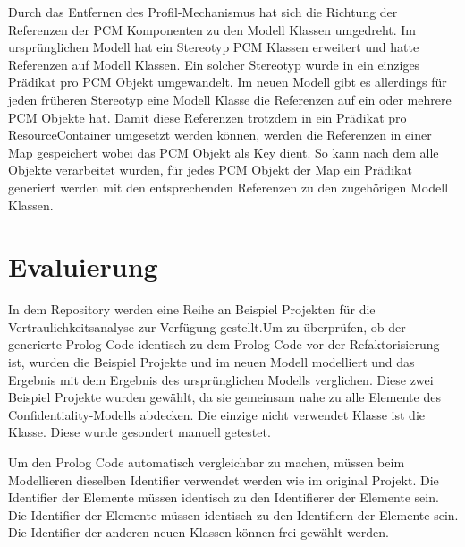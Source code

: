 \documentclass[twoside, ngerman]{sdqseminar}
\begin{document}
Durch das Entfernen des Profil-Mechanismus hat sich die Richtung der Referenzen der PCM Komponenten zu den Modell Klassen umgedreht. Im ursprünglichen Modell hat ein Stereotyp PCM Klassen erweitert und hatte Referenzen auf Modell Klassen. Ein solcher Stereotyp wurde in ein einziges Prädikat pro PCM Objekt umgewandelt. Im neuen Modell gibt es allerdings für jeden früheren Stereotyp eine Modell Klasse die Referenzen auf ein oder mehrere PCM Objekte hat. Damit diese Referenzen trotzdem in ein Prädikat pro ResourceContainer umgesetzt werden können, werden die Referenzen in einer Map gespeichert wobei das PCM Objekt als Key dient. So kann nach dem alle Objekte verarbeitet wurden, für jedes PCM Objekt der Map ein Prädikat generiert werden mit den entsprechenden Referenzen zu den zugehörigen Modell Klassen.

\section{Evaluierung}
In dem Repository  \cite{Examples4SCBS} werden eine Reihe an Beispiel Projekten für die Vertraulichkeitsanalyse zur Verfügung gestellt.Um zu überprüfen, ob der generierte Prolog Code identisch zu dem Prolog Code vor der Refaktorisierung ist, wurden die Beispiel Projekte  und  im neuen Modell modelliert und das Ergebnis mit dem Ergebnis des ursprünglichen Modells verglichen. Diese zwei Beispiel Projekte wurden gewählt, da sie gemeinsam nahe zu alle Elemente des Confidentiality-Modells abdecken. Die einzige nicht verwendet Klasse ist die  Klasse. Diese wurde gesondert manuell getestet.

Um den Prolog Code automatisch vergleichbar zu machen, müssen beim Modellieren dieselben Identifier verwendet werden wie im original Projekt. Die Identifier der  Elemente müssen identisch zu den Identifierer der  Elemente sein. Die Identifier der  Elemente müssen identisch zu den Identifiern der  Elemente sein. Die Identifier der anderen neuen Klassen können frei gewählt werden.
\end{document}
